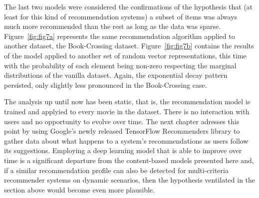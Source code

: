 The last two models were considered the confirmations of the hypothesis that (at
least for this kind of recommendation systems) a subset of items was always much
more recommended than the rest as long as the data was sparse.
Figure~\ref{fig:fig7a} represents the same recommendation algorithm applied to
another dataset, the Book-Crossing dataset. Figure~\ref{fig:fig7b} contains the
results of the model applied to another set of random vector representations,
this time with the probability of each element being non-zero respecting the
marginal distributions of the vanilla dataset. Again, the exponential decay
pattern persisted, only slightly less pronounced in the Book-Crossing case.

The analysis up until now has been static, that is, the recommendation model is
trained and applyied to every movie in the dataset. There is no interaction with
users and no opportunity to evolve over time. The next chapter adresses this
point by using Google's newly released TensorFlow Recommenders library
\citep{noauthor_tensorflow_nodate} to gather data about what happens to a
system's recommendations as users follow its suggestions. Employing a deep
learning model that is able to improve over time is a significant departure from
the content-based models presented here and, if a similar recommendation profile
can also be detected for multi-criteria recommender systems on dynamic
scenarios, then the hypothesis ventilated in the section above would become even
more plausible.
